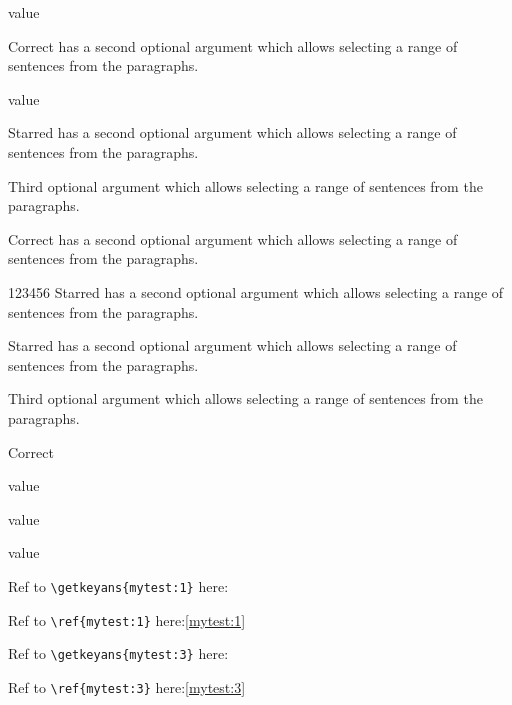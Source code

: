 \documentclass{article}
\begin{document}
\begin{enumext}[nosep,align=center,save-ans=mytest,show-ans=true,check-ans=true,save-ref=true,widest=99]
\begin{keyans}[columns=2,columns-sep=1cm,]
  \item value
  \item*[Z] Correct has a second optional argument
which allows selecting a range of sentences from the paragraphs.
  \item value
  \item Starred has a second optional argument
which allows selecting a range of sentences from the paragraphs.
\end{keyans}


\item Third optional argument
which allows selecting a range of sentences from the paragraphs.

\begin{keyans*}[itemindent=0.5cm,columns=1]
  \item*[L] Correct has a second optional argument
which allows selecting a range of sentences from the paragraphs.


  \item[123456] Starred has a second optional argument
which allows selecting a range of sentences from the paragraphs.
  \item Starred has a second optional argument
which allows selecting a range of sentences from the paragraphs.
\end{keyans*}

\item Third optional argument
which allows selecting a range of sentences from the paragraphs.

\begin{keyans*}[itemindent=0.5cm,columns=2]
  \item*[K] Correct
  \item value
  \item value
  \item value
\end{keyans*}

\end{enumext}

Ref to \verb+\getkeyans{mytest:1}+ here:\par
Ref to \verb+\ref{mytest:1}+ here:\ref{mytest:1}\par
Ref to \verb+\getkeyans{mytest:3}+ here:\par
Ref to \verb+\ref{mytest:3}+ here:\ref{mytest:3}

\end{document}
